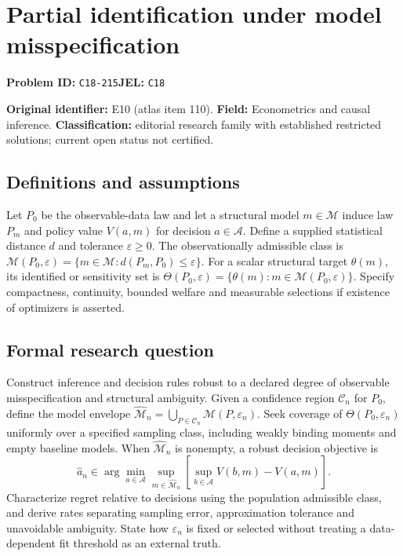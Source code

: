 \documentclass[11pt,a4paper]{article}
\begin{document}
\section*{Partial identification under model misspecification}
\textbf{Problem ID:} \texttt{C18-215}\quad \textbf{JEL:} \texttt{C18}\par
\label{problem:OP-0110}
\label{atlas:prob:E10}

\noindent\textbf{Original identifier:} E10 (atlas item 110). \textbf{Field:} Econometrics and causal inference. \textbf{Classification:} editorial research family with established restricted solutions; current open status not certified.

\subsection*{Definitions and assumptions}

Let $P_0$ be the observable-data law and let a structural model $m\in\mathcal M$ induce law $P_m$ and policy value $V(a,m)$ for decision $a\in\mathcal A$. Define a supplied statistical distance $d$ and tolerance $\varepsilon\ge0$. The observationally admissible class is $\mathcal M(P_0,\varepsilon)=\{m\in\mathcal M:d(P_m,P_0)\le\varepsilon\}$. For a scalar structural target $\theta(m)$, its identified or sensitivity set is $\Theta(P_0,\varepsilon)=\{\theta(m):m\in\mathcal M(P_0,\varepsilon)\}$. Specify compactness, continuity, bounded welfare and measurable selections if existence of optimizers is asserted.

\subsection*{Formal research question}

Construct inference and decision rules robust to a declared degree of observable misspecification and structural ambiguity. Given a confidence region $\mathcal C_n$ for $P_0$, define the model envelope $\widehat{\mathcal M}_n=\bigcup_{P\in\mathcal C_n}\mathcal M(P,\varepsilon_n)$. Seek coverage of $\Theta(P_0,\varepsilon_n)$ uniformly over a specified sampling class, including weakly binding moments and empty baseline models. When $\widehat{\mathcal M}_n$ is nonempty, a robust decision objective is
\[
\widehat a_n\in\arg\min_{a\in\mathcal A}
\sup_{m\in\widehat{\mathcal M}_n}
\left[\sup_{b\in\mathcal A}V(b,m)-V(a,m)\right].
\]
Characterize regret relative to decisions using the population admissible class, and derive rates separating sampling error, approximation tolerance and unavoidable ambiguity. State how $\varepsilon_n$ is fixed or selected without treating a data-dependent fit threshold as an external truth.
\end{document}
